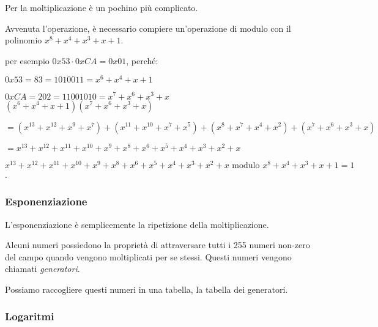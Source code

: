 
\textsf{\small Per la moltiplicazione è un pochino più complicato.} %

\textsf{\small Avvenuta l'operazione, è necessario compiere un'operazione di modulo con il polinomio $x^8 + x^4 + x^3 + x + 1$. } %

\textsf{\small per esempio $0x53 \cdot 0xCA = 0x01$, perché: } %

\textsf{\small $0x53 = 83 = 1010011 = x^6 + x^4 + x + 1$}

\textsf{\small $ 0xCA = 202 = 11001010 = x^7 + x^6 + x^3 + x $} \\

\textsf{\small $ (x^6 + x^4 + x + 1)(x^7 + x^6 + x^3 + x) $}

\textsf{\small $ = (x^{13} + x^{12} + x^9 + x^7)  + (x^{11} + x^{10} + x^7 + x^5) + (x^8 + x^7 + x^4 + x^2) + (x^7 + x^6 + x^3 + x)$}

\textsf{\small $ = x^{13} + x^{12} + x^{11} + x^{10} + x^9 + x^8 + x^6 + x^5 + x^4 + x^3 + x^2 + x$}

\textsf{\small $ x^{13} + x^{12} + x^{11} + x^{10} + x^9 + x^8 + x^6 + x^5 + x^4 + x^3 + x^2 + x \text{ modulo } x^8 + x^4 + x^3 + x + 1 = 1$.}

\subsubsection{Esponenziazione} %

 

\textsf{\small L'esponenziazione è semplicemente la ripetizione della moltiplicazione.}

\textsf{\small Alcuni numeri possiedono la proprietà di attraversare tutti i 255 numeri non-zero del campo quando vengono moltiplicati per se stessi. Questi numeri vengono chiamati \emph{generatori}.} %

\textsf{\small Possiamo raccogliere questi numeri in una tabella, la tabella dei generatori.}


\subsubsection{Logaritmi}


